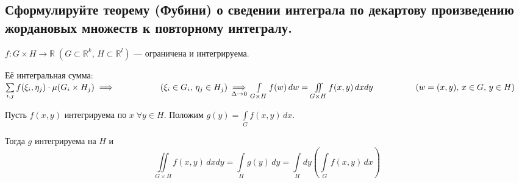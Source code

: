 
\subsection{Сформулируйте теорему (Фубини) о сведении интеграла по декартову произведению жордановых множеств к повторному интегралу.}
    \begin{theorem}[Фубини]
        $f : G \times H \to \mathbb{R} \; (G \subset \mathbb{R}^k, \, H \subset \mathbb{R}^l)$
        --- ограничена и интегрируема.
        
        Её интегральная сумма: $\sum\limits_{i, j} f(\xi_i, \eta_j) \cdot \mu(G_i \times H_j) \implies 
        \hspace{50 pt} (\xi_i \in G_i, \, \eta_j \in H_j) \\
        \underset{\Delta \to 0}{\implies} \int\limits_{G \times H} f(w)\, dw = \iint\limits_{G \times H}
        f(x, y)\, dxdy \hspace{50 pt} (w = (x, y),\, x \in G,\, y \in H)$
        
        Пусть $f(x, y)$ интегрируема по $x \; \forall y \in H$. Положим $g(y) = \int\limits_G f(x, y)\, dx$.
        
        Тогда $g$ интегрируема на $H$ и 
        \[ \iint\limits_{G \times H} f(x, y)\, dxdy = \int\limits_H g(y)\, dy
        = \int\limits_H dy \left( \int\limits_G f(x, y)\, dx \right) \]
    \end{theorem}
